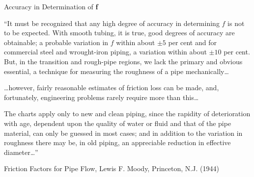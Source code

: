 \documentclass[9pt,xcolor=x11names,professionalfonts, mathserif]{beamer}
\begin{document}
											      								\begin{frame}{Accuracy in Determination of \textbf{f}}
											      									
											      									\begin{cmini}{
											      											``It must be recognized that any high degree of accuracy in determining $f$ is not to be expected. With smooth tubing, it is true,
											      											good degrees of accuracy are obtainable; a probable variation in $f$ within about $\pm5$ per cent and for commercial
											      											steel and wrought-iron piping, a variation within about $\pm10$ per cent. But, in the transition and rough-pipe regions, we lack the primary and obvious essential, a technique for measuring
											      											the roughness of a pipe mechanically\ldots
											      											\par\medskip
											      											\ldots however, fairly reasonable estimates of friction loss can be made, and, fortunately, engineering problems rarely require more than this\ldots
											      											\par\medskip
											      											The charts apply only to new and clean piping, since the rapidity of deterioration with age, dependent upon the quality of water or fluid and that
											      											of the pipe material, can only be guessed in most cases; and in addition to the variation in roughness there may be, in old piping, an appreciable reduction in effective
											      											diameter\ldots''
											      											}\end{cmini}
											      										
											      										\hfill{\footnotesize{Friction Factors for Pipe Flow, Lewis F. Moody, Princeton, N.J. (1944)}}
											      										\end{frame}
											      										
\end{document}
